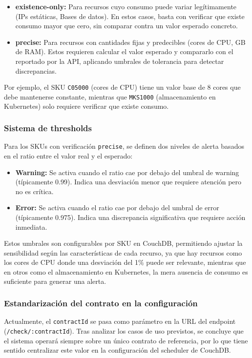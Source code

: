\begin{itemize}
    \item \textbf{existence-only:} Para recursos cuyo consumo puede variar legítimamente (IPs estáticas, Bases de datos). En estos casos, basta con verificar que existe consumo mayor que cero, sin comparar contra un valor esperado concreto.
    
    \item \textbf{precise:} Para recursos con cantidades fijas y predecibles (cores de CPU, GB de RAM). Estos requieren calcular el valor esperado y compararlo con el reportado por la API, aplicando umbrales de tolerancia para detectar discrepancias.
\end{itemize}

Por ejemplo, el SKU \texttt{C05000} (cores de CPU) tiene un valor base de 8 cores que debe mantenerse constante, mientras que \texttt{MKS1000} (almacenamiento en Kubernetes) solo requiere verificar que existe consumo.

\subsubsection{Sistema de thresholds}
Para los SKUs con verificación \texttt{precise}, se definen dos niveles de alerta basados en el ratio entre el valor real y el esperado:

\begin{itemize}
    \item \textbf{Warning:} Se activa cuando el ratio cae por debajo del umbral de warning (típicamente 0.99). Indica una desviación menor que requiere atención pero no es crítica.
    
    \item \textbf{Error:} Se activa cuando el ratio cae por debajo del umbral de error (típicamente 0.975). Indica una discrepancia significativa que requiere acción inmediata.
\end{itemize}

Estos umbrales son configurables por SKU en CouchDB, permitiendo ajustar la sensibilidad según las características de cada recurso, ya que hay recursos como los cores de CPU donde una desviación del 1\% puede ser relevante, mientras que en otros como el almacenamiento en Kubernetes, la mera ausencia de consumo es suficiente para generar una alerta.

\subsubsection{Estandarización del contrato en la configuración}
Actualmente, el \texttt{contractId} se pasa como parámetro en la URL del endpoint (\texttt{/check/:contractId}). Tras analizar los casos de uso previstos, se concluye que el sistema operará siempre sobre un único contrato de referencia, por lo que tiene sentido centralizar este valor en la configuración del scheduler de CouchDB.

